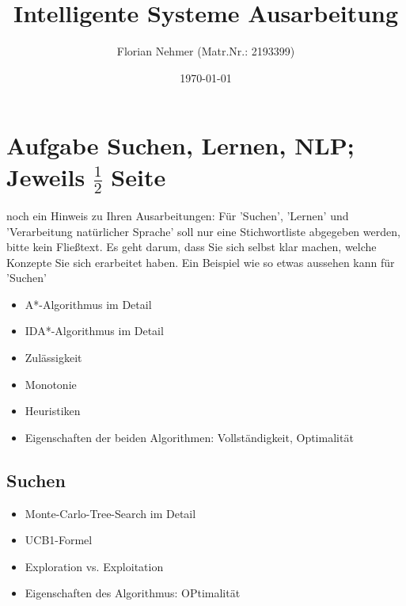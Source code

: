 \documentclass[a4paper, 11pt]{scrartcl}
\title{Intelligente Systeme Ausarbeitung}
\author{Florian Nehmer (Matr.Nr.: 2193399)}
\date{\today}
\begin{document}
\maketitle

\newpage
\tableofcontents

\newpage


\section{Aufgabe Suchen, Lernen, NLP; Jeweils $\frac{1}{2}$ Seite}
noch ein Hinweis zu Ihren Ausarbeitungen: Für 'Suchen', 'Lernen' und 'Verarbeitung natürlicher Sprache' soll nur eine Stichwortliste
abgegeben werden, bitte kein Fließtext. Es geht darum, dass Sie sich selbst klar machen, welche Konzepte Sie sich erarbeitet haben.
Ein Beispiel wie so etwas aussehen kann für 'Suchen'

\begin{itemize}
\item A*-Algorithmus im Detail
\item IDA*-Algorithmus im Detail
\item Zulässigkeit
\item Monotonie
\item Heuristiken
\item Eigenschaften der beiden Algorithmen: Vollständigkeit, Optimalität
\end{itemize}

\subsection{Suchen}
\begin{itemize}
  \item Monte-Carlo-Tree-Search im Detail
  \item UCB1-Formel
  \item Exploration vs. Exploitation
  \item Eigenschaften des Algorithmus: OPtimalität
\end{itemize}
\end{document}
